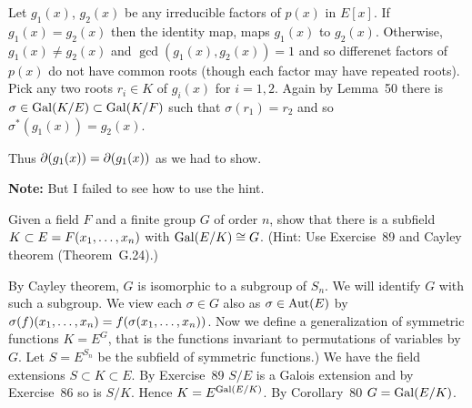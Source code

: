 \begin{myenumerate}
Let \(g_1(x)\), \(g_2(x)\) be any irreducible factors of \(p(x)\) in \(E[x]\).
If \(g_1(x) = g_2(x)\) then the identity map, maps
\(g_1(x)\) to \(g_2(x)\).
Otherwise, \(g_1(x) \neq g_2(x)\) and \(\gcd(g_1(x), g_2(x)) = 1\)
and so differenet factors of \(p(x)\) do not have common roots
(though each factor may have repeated roots).
Pick any two roots \(r_i\in K\) of \(g_i(x)\) for \(i=1,2\).
Again by Lemma~50 \cite{Rotman98} there is
\(\sigma \in \mathop{\rm Gal}\nolimits(K/E) \subset \mathop{\rm Gal}\nolimits(K/F)\)
such that \(\sigma(r_1)=r_2\)
and so \(\sigma^*(g_1(x))=g_2(x)\).

Thus \(\partial(g_1(x)) = \partial(g_1(x))\) as we had to show.

\textbf{Note:} But I failed to see how to use the hint.

\item
\begin{excopy}
Given a field $F$ and a finite group $G$ of order $n$,
show that there is a subfield
\(K\subset E = F(x_1,\ldots,x_{n})\) with \(\mathop{\rm Gal}\nolimits(E/K)\cong G\).
(Hint: Use Exercise~89 and Cayley theorem (Theorem~G.24).)
\end{excopy}

By Cayley theorem, $G$ is isomorphic to a subgroup of \(S_n\).
We will identify $G$ with such a subgroup. We view each \(\sigma\in G\)
also as \(\sigma\in \mathop{\rm Aut}\nolimits(E)\) by \(\sigma(f)(x_1,\ldots,x_{n})=f(\sigma(x_1,\ldots,x_{n}))\).
Now we define a generalization of symmetric functions \(K=E^G\),
that is the functions invariant to permutations of variables by $G$.
Let \(S=E^{S_n}\) be the subfield of symmetric functions.)
We have the field extensions \(S\subset K \subset E\).
By Exercise~89 \(S/E\) is a Galois extension and by Exercise~86 so is \(S/K\).
Hence \(K=E^{\mathop{\rm Gal}\nolimits(E/K)}\). By Corollary~80 \cite{Rotman98} \(G=\mathop{\rm Gal}\nolimits(E/K)\).

\iffalse
Define the subgroup
\begin{equation*}
G^* = \{\sigma*\in \Aut(E): \sigma\in G\}
\end{equation*}
where \(\sigma^*(f(\seqxn)) = f(\sigma(x_1),\ldots,\sigma(x_n))\).
It is easy to see that \(\sigma \mapsto \sigma^*\) gives
the isomorphism \(G\cong G^*\). We will identify $G$ with \(G^*\) as well.


Define (generalization of symmetric functions):
\begin{equation*}
K = \{f(x)\in E: \forall \sigma\in G,\, \sigma^*(f(x))=f(x)\}.
\end{equation*}

By definition, for any \(\sigma\in G\), the induced map \(\sigma^*\)
is the identity on $K$ and so \(\sigma\in \Gal(E/K\) and \(G^* \subset
\Gal(E/K)\).  Conversely, let \(\sigma\in \Gal(E/K)\).

\fi

\end{myenumerate}


